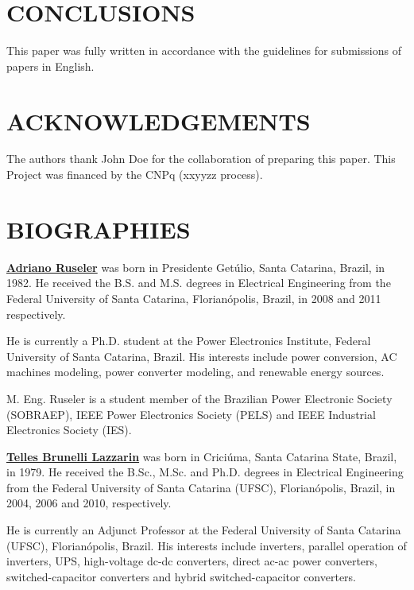 \documentclass[english]{sobraep}
\begin{document}




\section{CONCLUSIONS}
This paper was fully written in accordance with the guidelines for submissions of papers in English.


\section*{ACKNOWLEDGEMENTS}
The authors thank John Doe for the collaboration of preparing this paper. This Project was financed by the CNPq (xxyyzz process).





\balance

\section*{BIOGRAPHIES}

\textbf{\underline{Adriano Ruseler}}
was born in Presidente Getúlio, Santa Catarina, Brazil, in 1982. He received the B.S. and M.S. degrees in Electrical Engineering from 
the Federal University of Santa Catarina, Florianópolis, Brazil,  in 2008 and 2011 respectively.

He is currently a Ph.D. student at the Power Electronics Institute, Federal University of Santa Catarina, Brazil. His interests include power conversion, AC machines modeling, power converter modeling, and renewable energy sources.

M. Eng. Ruseler is a student member of the Brazilian Power Electronic Society (SOBRAEP), IEEE Power Electronics Society (PELS) and IEEE Industrial Electronics Society (IES). 

\vspace{5mm}

\textbf{\underline{Telles Brunelli Lazzarin}}
was born in Criciúma, Santa Catarina State, Brazil, in 1979. He received the B.Sc., M.Sc. and Ph.D. degrees in Electrical Engineering from the Federal University of Santa Catarina (UFSC), Florian\'opolis, Brazil, in 2004, 2006 and 2010, respectively.

He is currently an Adjunct Professor at the Federal University of Santa Catarina (UFSC), Florianópolis, Brazil.  His interests include inverters, parallel operation of inverters, UPS, high-voltage dc-dc converters, direct ac-ac power converters, switched-capacitor converters and hybrid switched-capacitor converters.
\end{document}
